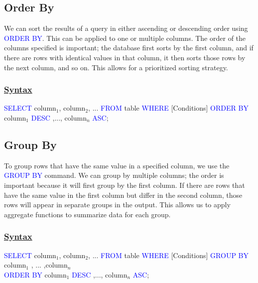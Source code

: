 \subsection{Order By}
\begin{tcolorbox}[title = Definition]
We can sort the results of a query in either ascending or descending order using \textcolor{blue}{ORDER BY}. 
This can be applied to one or multiple columns. The order of the columns specified is important; the database
first sorts by the first column, and if there are rows with identical values in that column, it then sorts those
rows by the next column, and so on. This allows for a prioritized sorting strategy.
\end{tcolorbox}

\subsubsection*{\underline{Syntax}}

\begin{tcolorbox}[title = Order By Clause]
\textcolor{blue}{SELECT} column$_{1}$, column$_{2}$, ... \textcolor{blue}{FROM} table \textcolor{blue}{WHERE}
{[Conditions]} \textcolor{blue}{ORDER BY} column$_{1}$ \textcolor{blue}{DESC} ,..., column$_{n}$ \textcolor{blue}{ASC};
\end{tcolorbox}

\subsection{Group By} 
\begin{tcolorbox}[title = Definition]
To group rows that have the same value in a specified column, we use the \textcolor{blue}{GROUP BY} command.
We can group by multiple columns; the order is important because it will first group by the first column. If there
are rows that have the same value in the first column but differ in the second column, those rows will appear in
separate groups in the output. This allows us to apply aggregate functions to summarize data for each group.
\end{tcolorbox}
\subsubsection*{\underline{Syntax}}
\begin{tcolorbox}[title = Group By Clause]
\textcolor{blue}{SELECT} column$_{1}$, column$_{2}$, ... \textcolor{blue}{FROM} table \textcolor{blue}{WHERE}
{[Conditions]} \textcolor{blue}{GROUP BY} column$_{1}$ , ... ,column$_{n}$\\ 
\textcolor{blue}{ORDER BY} column$_{1}$ \textcolor{blue}{DESC} ,..., column$_{n}$ \textcolor{blue}{ASC};

\end{tcolorbox}
